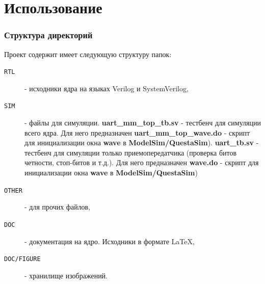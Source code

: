 \documentclass[a4paper,12pt]{article}
\begin{document}
\section{Использование}
\subsubsection{Структура директорий}
  Проект содержит имеет следующую структуру папок:


\begin{description}
    \item[\texttt{RTL}] - исходники ядра на языках Verilog и SystemVerilog,
    \item[\texttt{SIM}] - файлы для симуляции. \textbf{uart\_mm\_top\_tb.sv} - тестбенч для симуляции всего ядра. Для него предназначен \textbf{uart\_mm\_top\_wave.do} - скрипт для инициализации окна \textbf{wave} в \textbf{ModelSim/QuestaSim}). \textbf{uart\_tb.sv} - тестбенч для симуляции только приемопередатчика (проверка битов четности, стоп-битов и т.д.). Для него предназначен \textbf{wave.do} - скрипт для инициализации окна \textbf{wave} в \textbf{ModelSim/QuestaSim})
    \item[\texttt{OTHER}] - для прочих файлов,
    \item[\texttt{DOC}] - документация на ядро. Исходники в формате \LaTeX,
    \item[\texttt{DOC/FIGURE}] - хранилище изображений.
\end{description}
\end{document}
